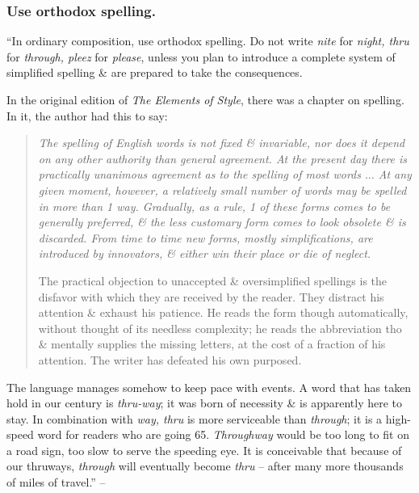 \documentclass{article}
\begin{document}

\subsubsection{Use orthodox spelling.}
``In ordinary composition, use orthodox spelling. Do not write {\it nite} for {\it night, thru} for {\it through, pleez} for {\it please}, unless you plan to introduce a complete system of simplified spelling \& are prepared to take the consequences.

In the original edition of {\it The Elements of Style}, there was a chapter on spelling. In it, the author had this to say:
\begin{quotation}\it
	The spelling of English words is not fixed \& invariable, nor does it depend on any other authority than general agreement. At the present day there is practically unanimous agreement as to the spelling of most words $\ldots$ At any given moment, however, a relatively small number of words may be spelled in more than 1 way. Gradually, as a rule, 1 of these forms comes to be generally preferred, \& the less customary form comes to look obsolete \& is discarded. From time to time new forms, mostly simplifications, are introduced by innovators, \& either win their place or die of neglect.
	
	The practical objection to unaccepted \& oversimplified spellings is the disfavor with which they are received by the reader. They distract his attention \& exhaust his patience. He reads the form though automatically, without thought of its needless complexity; he reads the abbreviation tho \& mentally supplies the missing letters, at the cost of a fraction of his attention. The writer has defeated his own purposed.
\end{quotation}
The language manages somehow to keep pace with events. A word that has taken hold in our century is {\it thru-way}; it was born of necessity \& is apparently here to stay. In combination with {\it way, thru} is more serviceable than {\it through}; it is a high-speed word for readers who are going 65. {\it Throughway} would be too long to fit on a road sign, too slow to serve the speeding eye. It is conceivable that because of our thruways, {\it through} will eventually become {\it thru} -- after many more thousands of miles of travel.'' -- \cite[p. 88]{Strunk_White_element_style}

\end{document}
